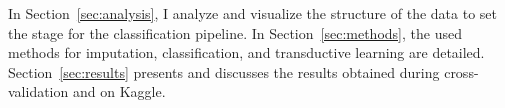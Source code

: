 In Section~\ref{sec:analysis}, I analyze and visualize
the structure of the data to set the stage for the classification pipeline. In
Section~\ref{sec:methods}, the used methods for imputation, classification, and transductive learning are detailed. Section~\ref{sec:results} presents and discusses the results obtained during cross-validation and on
Kaggle.